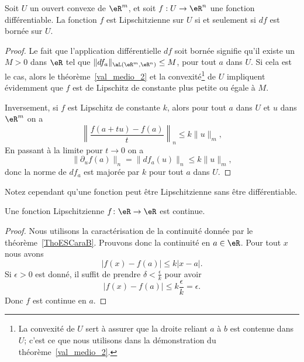 \begin{proposition}
	Soit  \( U\) un ouvert convexe  de \( \eR^m\), et soit \( f:U\to \eR^n\) une fonction différentiable. La fonction \( f\) est Lipschitzienne sur \( U\) si et seulement si \( df\) est bornée sur \( U\).
\end{proposition}
\begin{proof}
	Le fait que l'application différentielle \( df\) soit bornée signifie qu'il existe un \( M>0\) dans \( \eR\) tel que \( \|df_a\|_{\aL(\eR^m,\eR^n)}\leq M\), pour tout \( a\) dans \( U\). Si cela est le cas, alors le théorème~\ref{val_medio_2} et la convexité\footnote{La convexité de \( U\) sert à assurer que la droite reliant \( a\) à \( b\) est contenue dans \( U\); c'est ce que nous utilisons dans la démonstration du théorème~\ref{val_medio_2}.} de \( U\) impliquent évidemment que \( f\) est de Lipschitz de constante plus petite ou égale à \( M\).

	Inversement, si \( f\) est Lipschitz de constante \( k\), alors pour tout \( a\) dans \( U\) et \( u\) dans \( \eR^m\) on a
	\[
		\left\|\frac{f(a+tu)-f(a)}{t}\right\|_n\leq k \|u\|_m,
	\]
	En passant à la limite pour \( t\to 0\) on a
	\[
		\|\partial_u f(a)\|_n=\|df_a(u)\|_n\leq k \|u\|_m,
	\]
	donc la norme de \( df_a\) est majorée par \( k\) pour tout \( a\) dans \( U\).
\end{proof}

Notez cependant qu'une fonction peut être Lipschitzienne sans être différentiable.

\begin{proposition} \label{PropFZgFTEW}
	Une fonction Lipschitzienne \( f\colon \eR\to \eR\) est continue.
\end{proposition}

\begin{proof}
	Nous utilisons la caractérisation de la continuité donnée par le théorème~\ref{ThoESCaraB}. Prouvons donc la continuité en \( a\in \eR\). Pour tout \( x\) nous avons
	\begin{equation}
		\big| f(x)-f(a) \big|\leq k| x-a |.
	\end{equation}
	Si \( \epsilon>0\) est donné, il suffit de prendre \( \delta<\frac{ \epsilon }{ k }\) pour avoir
	\begin{equation}
		\big| f(x)-f(a) \big|\leq k\frac{ \epsilon }{ k }=\epsilon.
	\end{equation}
	Donc \( f\) est continue en \( a\).
\end{proof}

